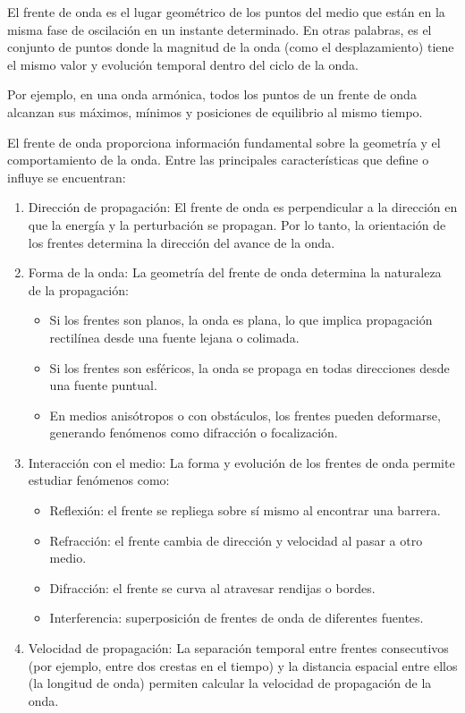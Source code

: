 El frente de onda es el lugar geométrico de los puntos del medio que están en la misma fase de oscilación en un instante determinado. En otras palabras, es el conjunto de puntos donde la magnitud de la onda (como el desplazamiento) tiene el mismo valor y evolución temporal dentro del ciclo de la onda.

Por ejemplo, en una onda armónica, todos los puntos de un frente de onda alcanzan sus máximos, mínimos y posiciones de equilibrio al mismo tiempo.

El frente de onda proporciona información fundamental sobre la geometría y el comportamiento de la onda. Entre las principales características que define o influye se encuentran:

\begin{enumerate}
  \item Dirección de propagación: El frente de onda es perpendicular a la dirección en que la energía y la perturbación se propagan. Por lo tanto, la orientación de los frentes determina la dirección del avance de la onda.
  \item Forma de la onda: La geometría del frente de onda determina la naturaleza de la propagación:
    \begin{itemize}
      \item Si los frentes son planos, la onda es plana, lo que implica propagación rectilínea desde una fuente lejana o colimada.
      \item Si los frentes son esféricos, la onda se propaga en todas direcciones desde una fuente puntual.
      \item En medios anisótropos o con obstáculos, los frentes pueden deformarse, generando fenómenos como difracción o focalización.
    \end{itemize}
  \item Interacción con el medio: La forma y evolución de los frentes de onda permite estudiar fenómenos como:
    \begin{itemize}
      \item Reflexión: el frente se repliega sobre sí mismo al encontrar una barrera.
      \item Refracción: el frente cambia de dirección y velocidad al pasar a otro medio.
      \item Difracción: el frente se curva al atravesar rendijas o bordes.
      \item Interferencia: superposición de frentes de onda de diferentes fuentes.
    \end{itemize}
  \item Velocidad de propagación: La separación temporal entre frentes consecutivos (por ejemplo, entre dos crestas en el tiempo) y la distancia espacial entre ellos (la longitud de onda) permiten calcular la velocidad de propagación de la onda.
\end{enumerate}

